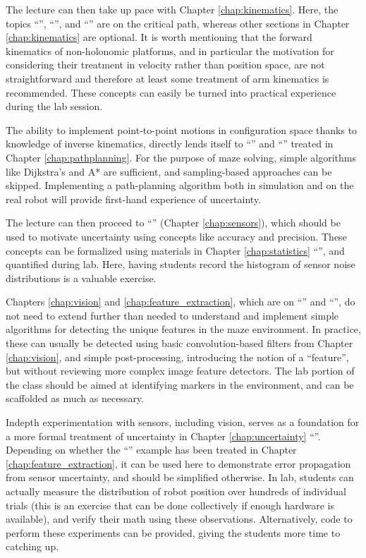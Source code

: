 The lecture can then take up pace with Chapter \ref{chap:kinematics}. Here, the topics ``'', ``'', and ``'' are on the critical path, whereas other sections in Chapter \ref{chap:kinematics} are optional. It is worth mentioning that the forward kinematics of non-holonomic platforms, and in particular the motivation for considering their treatment in velocity rather than position space, are not straightforward and therefore at least some treatment of arm kinematics is recommended. These concepts can easily be turned into practical experience during the lab session.

The ability to implement point-to-point motions in configuration space thanks to knowledge of inverse kinematics, directly lends itself to ``'' and ``'' treated in Chapter \ref{chap:pathplanning}. For the purpose of maze solving, simple algorithms like Dijkstra's and A* are sufficient, and sampling-based approaches can be skipped. Implementing a path-planning algorithm both in simulation and on the real robot will provide first-hand experience of uncertainty.

The lecture can then proceed to ``'' (Chapter \ref{chap:sensors}), which should be used to motivate uncertainty using concepts like accuracy and precision. These concepts can be formalized using materials in Chapter \ref{chap:statistics} ``'', and quantified during lab. Here, having students record the histogram of sensor noise distributions is a valuable exercise.

Chapters \ref{chap:vision} and \ref{chap:feature_extraction}, which are on ``'' and ``'', do not need to extend further than needed to understand and implement simple algorithms for detecting the unique features in the maze environment. In practice, these can usually be detected using basic convolution-based filters from Chapter \ref{chap:vision}, and simple post-processing, introducing the notion of a ``feature'', but without reviewing more complex image feature detectors. The lab portion of the class should be aimed at identifying markers in the environment, and can be scaffolded as much as necessary.

Indepth experimentation with sensors, including vision, serves as a foundation for a more formal treatment of uncertainty in Chapter \ref{chap:uncertainty} ``''. Depending on whether the ``'' example has been treated in Chapter \ref{chap:feature_extraction}, it can be used here to demonstrate error propagation from sensor uncertainty, and should be simplified otherwise. In lab, students can actually measure the distribution of robot position over hundreds of individual trials (this is an exercise that can be done collectively if enough hardware is available), and verify their math using these observations. Alternatively, code to perform these experiments can be provided, giving the students more time to catching up.


